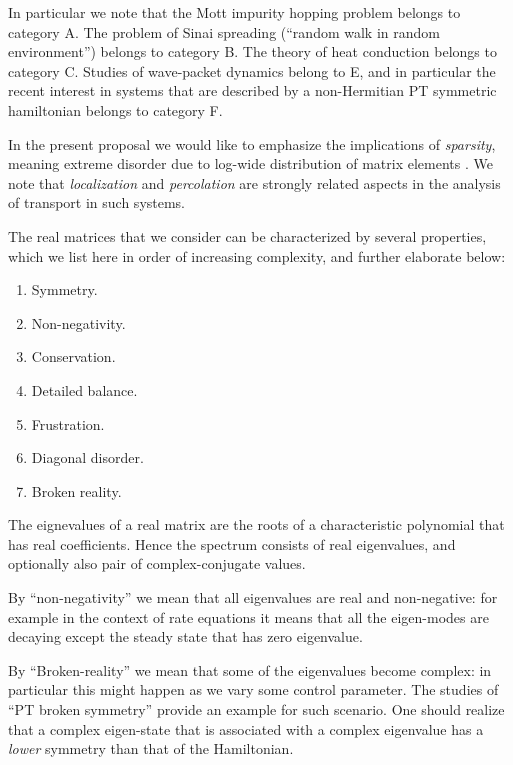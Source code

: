 In particular we note that the Mott impurity hopping problem 
\cite{miller_impurity_1960,movaghar_theory_1981}
belongs to category A. The problem of Sinai spreading (``random 
walk in random environment'')
\cite{sinai_limiting_1983,bouchaud_anomalous_1990}
belongs to category B.
The theory of heat conduction 
\cite{nagel_normal-mode_1981,schirmacher_analogies_1992,
amir_localization_2010,amir_mean-field_2008,tong_wave_1999}
belongs to category C. 
Studies of wave-packet dynamics\cite{izrailev_evolution_1997,cohen_wave_2000} belong to E, and 
in particular the recent interest in systems that are described by 
a non-Hermitian PT symmetric hamiltonian
\cite{bender_exactly_2008,mannheim_astrophysical_2012,jin_physical_2011,zheng_heat_2011}
 belongs to category F.

In the present proposal we would like to emphasize the 
implications of {\em sparsity}, meaning extreme disorder 
due to log-wide distribution of matrix elements
\cite{rodgers_density_1988,biroli_single_1999,
fortin_asymptotic_2005,metz_localization_2010,
cohen_energy_2012,stotland_semilinear_2009}. 
We note that {\em localization} and {\em percolation} are strongly 
related aspects in the analysis of transport in such systems. 


The real matrices that we consider can be characterized 
by several properties, which we list here in order of increasing 
complexity, and further elaborate below:

\begin{enumerate}
\item Symmetry.
\item Non-negativity.
\item Conservation.
\item Detailed balance.
\item Frustration.
\item Diagonal disorder.
\item Broken reality.
\end{enumerate}

The eignevalues of a real matrix are the roots of a characteristic 
polynomial that has real coefficients. Hence the spectrum consists 
of real eigenvalues, and optionally also pair of complex-conjugate 
values. 

By ``non-negativity'' we mean that all eigenvalues are real and 
non-negative: for example in the context of rate equations it means 
that all the eigen-modes are decaying except the steady state 
that has zero eigenvalue. 

By ``Broken-reality'' we mean that some of the eigenvalues  
become complex: in particular this might happen 
as we vary some control parameter. The studies of ``PT broken symmetry'' 
provide an example for such scenario. One should realize that  
a complex eigen-state that is associated with a complex eigenvalue 
has a {\em lower} symmetry than that of the Hamiltonian.

